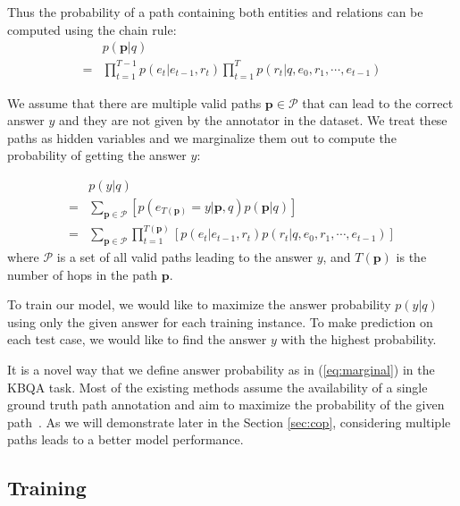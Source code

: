 Thus the probability of a path containing both entities and relations can be computed using the chain rule:
\begin{align}
&p(\mathbf{p}|q)\nonumber\\
=& \prod_{t=1}^{T-1}p(e_t|e_{t-1},r_t)\prod_{t=1}^{T}p(r_t|q,e_0,r_1,\cdots,e_{t-1}) 
\end{align}

We assume that there are multiple valid paths $\mathbf{p}\in \mathcal{P}$ that can lead to the correct answer $y$ and they are not given by the annotator in the dataset. We treat these paths as hidden variables and we marginalize them out to compute the probability of getting the answer $y$:

\begin{align}
&p(y|q)\nonumber\\
=&\sum_{\mathbf{p}\in\mathcal{P}} [p(e_{T(\mathbf{p})}=y|\mathbf{p},q)p(\mathbf{p}|q)] \nonumber\\
=&\sum_{\mathbf{p}\in\mathcal{P}}\prod_{t=1}^{T(\mathbf{p})} [p(e_t|e_{t-1},r_t) p(r_t|q,e_0,r_1,\cdots,e_{t-1})]
\label{eq:marginal}
\end{align}
where $\mathcal{P}$ is a set of all valid paths leading to the answer $y$, and $T(\mathbf{p})$ is the number of hops in the path $\mathbf{p}$.

To train our model, we would like to maximize the answer probability $p(y|q)$ using only the given answer for each training instance. To make prediction on each test case, we would like to find the answer $y$ with the highest probability.

It is a novel way that we define answer probability as in (\ref{eq:marginal}) in the KBQA task. Most of the existing methods assume the availability of a single ground truth path annotation and aim to maximize the probability of the given path~\cite{DBLP:conf/coling/ZhouHZ18}. As we will demonstrate later in the Section \ref{sec:cop}, considering multiple paths leads to a better model performance.











\subsection{Training}


